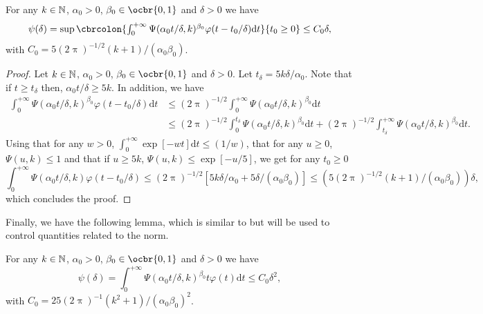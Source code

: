 \begin{lemma}
	\label{lemma:tail_chi_square_int}
	For any $k \in \mathbb{N}$, $\alpha_0>0$, $\beta_0 \in \ocbr{0,1}$ and $\delta > 0$ we have \begin{equation} \psi(\delta) = \textstyle{\sup \cbrcolon{\int_0^{+\infty} \Psi(\alpha_0 t/\delta, k)^{\beta_0} \varphi(t - t_0/\delta) \mathrm{d} t}{t_0 \geq 0}} \leq C_0 \delta , \end{equation} with $C_0 = 5(2\uppi)^{-1/2}(k+1)/(\alpha_0 \beta_0)$.
\end{lemma}

\begin{proof}
	Let $k \in \mathbb{N}$, $\alpha_0 >0$, $\beta_0 \in \ocbr{0,1}$ and $\delta > 0$.
	Let $t_{\delta} = 5 k \delta /\alpha_0$.
	Note that if $t \geq t_\delta$ then, $\alpha_0 t /\delta \geq 5k$.
	In addition, we have \begin{align} \textstyle \int_0^{+\infty} \Psi(\alpha_0 t/\delta, k)^{\beta_0} \varphi(t - t_0/\delta) \mathrm{d} t & \textstyle \leq (2 \uppi)^{-1/2} \int_0^{+\infty} \Psi(\alpha_0 t/\delta, k)^{\beta_0} \mathrm{d} t \\ & \textstyle \leq (2 \uppi)^{-1/2} \int_0^{t_\delta} \Psi(\alpha_0 t/\delta, k)^{\beta_0} \mathrm{d} t + (2 \uppi)^{-1/2} \int_{t_\delta}^{+\infty} \Psi(\alpha_0 t/\delta, k)^{\beta_0} \mathrm{d} t .
	\end{align}
	Using that for any $w >0$, $\int_0^{+\infty} \exp[-w t] \mathrm{d} t \leq (1/w)$, that for any $u \geq 0$, $\Psi(u, k) \leq 1$ and that if $u \geq 5k$, $\Psi(u,k) \leq \exp[-u/5]$, we get for any $t_0 \geq 0$ \begin{equation} \textstyle \int_0^{+\infty} \Psi(\alpha_0 t/\delta, k) \varphi(t - t_0/\delta) \leq (2\uppi)^{-1/2} [5k \delta/\alpha_0 + 5 \delta/(\alpha_0 \beta_0)] \leq (5(2\uppi)^{-1/2}(k+1)/(\alpha_0\beta_0)) \delta , \end{equation} which concludes the proof.
\end{proof}

Finally, we have the following lemma, which is similar to  but will be used to control quantities related to the norm.

\begin{lemma}
	\label{lemma:tail_chi_square_int_duo}
	For any $k \in \mathbb{N}$, $\alpha_0>0$, $\beta_0 \in \ocbr{0,1}$ and $\delta > 0$ we have \begin{equation} \psi(\delta) = \textstyle{ \int_0^{+\infty} \Psi(\alpha_0 t/\delta, k)^{\beta_0} t \varphi(t) \mathrm{d} t} \leq C_0 \delta^2 , \end{equation} with $C_0 = 25(2\uppi)^{-1}(k^2+1)/(\alpha_0\beta_0)^2$.
\end{lemma}

